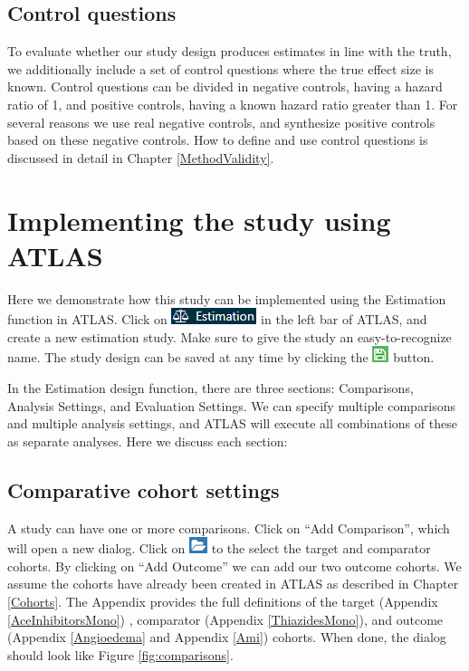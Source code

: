 \documentclass[11pt]{book}
\theoremstyle{definition}
\theoremstyle{definition}
\theoremstyle{definition}
\theoremstyle{remark}
\begin{document}
\hypertarget{control-questions}{%
\subsection{Control questions}\label{control-questions}}

To evaluate whether our study design produces estimates in line with the truth, we additionally include a set of control questions where the true effect size is known. Control questions can be divided in negative controls, having a hazard ratio of 1, and positive controls, having a known hazard ratio greater than 1. For several reasons we use real negative controls, and synthesize positive controls based on these negative controls. How to define and use control questions is discussed in detail in Chapter \ref{MethodValidity}.

\hypertarget{PleAtlas}{%
\section{Implementing the study using ATLAS}\label{PleAtlas}}

Here we demonstrate how this study can be implemented using the Estimation function in ATLAS. Click on \includegraphics{images/PopulationLevelEstimation/estimation.png} in the left bar of ATLAS, and create a new estimation study. Make sure to give the study an easy-to-recognize name. The study design can be saved at any time by clicking the \includegraphics{images/PopulationLevelEstimation/save.png} button.

In the Estimation design function, there are three sections: Comparisons, Analysis Settings, and Evaluation Settings. We can specify multiple comparisons and multiple analysis settings, and ATLAS will execute all combinations of these as separate analyses. Here we discuss each section:

\hypertarget{ComparisonSettings}{%
\subsection{Comparative cohort settings}\label{ComparisonSettings}}

A study can have one or more comparisons. Click on ``Add Comparison'', which will open a new dialog. Click on \includegraphics{images/PopulationLevelEstimation/open.png} to the select the target and comparator cohorts. By clicking on ``Add Outcome'' we can add our two outcome cohorts. We assume the cohorts have already been created in ATLAS as described in Chapter \ref{Cohorts}. The Appendix provides the full definitions of the target (Appendix \ref{AceInhibitorsMono}) , comparator (Appendix \ref{ThiazidesMono}), and outcome (Appendix \ref{Angioedema} and Appendix \ref{Ami}) cohorts. When done, the dialog should look like Figure \ref{fig:comparisons}.
\end{document}
